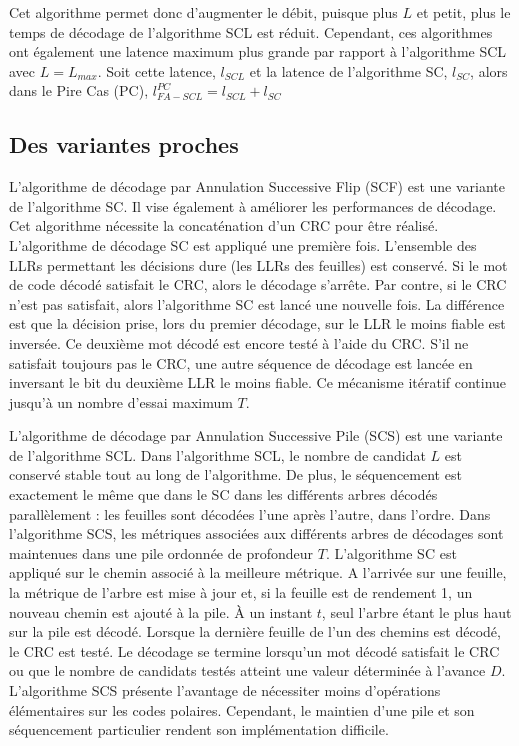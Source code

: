 Cet algorithme permet donc d'augmenter le débit, puisque plus $L$ et petit, plus le temps de décodage de l'algorithme SCL est réduit. Cependant, ces algorithmes ont également une latence maximum plus grande par rapport à l'algorithme SCL avec $L=L_{max}$. Soit cette latence, $l_{SCL}$ et la latence de l'algorithme SC, $l_{SC}$, alors dans le Pire Cas (PC), $l^{PC}_{FA-SCL}=l_{SCL}+l_{SC}$

\subsection{Des variantes proches}

	L'algorithme de décodage par Annulation Successive Flip (SCF) \cite{afisiadis_low-complexity_2014} est une variante de l'algorithme SC. Il vise également à améliorer les performances de décodage. Cet algorithme nécessite la concaténation d'un CRC pour être réalisé. L'algorithme de décodage SC est appliqué une première fois. L'ensemble des LLRs permettant les décisions dure (les LLRs des feuilles) est conservé. Si le mot de code décodé satisfait le CRC, alors le décodage s'arrête. Par contre, si le CRC n'est pas satisfait, alors l'algorithme SC est lancé une nouvelle fois. La différence est que la décision prise, lors du premier décodage, sur le LLR le moins fiable est inversée. Ce deuxième mot décodé est encore testé à l'aide du CRC. S'il ne satisfait toujours pas le CRC, une autre séquence de décodage est lancée en inversant le bit du deuxième LLR le moins fiable. Ce mécanisme itératif continue jusqu'à un nombre d'essai maximum $T$.


	L'algorithme de décodage par Annulation Successive Pile (SCS) \cite{chen_improved_2013} est une variante de l'algorithme SCL. Dans l'algorithme SCL, le nombre de candidat $L$ est conservé stable tout au long de l'algorithme. De plus, le séquencement est exactement le même que dans le SC dans les différents arbres décodés parallèlement : les feuilles sont décodées l'une après l'autre, dans l'ordre. Dans l'algorithme SCS, les métriques associées aux différents arbres de décodages sont maintenues dans une pile ordonnée de profondeur $T$. L'algorithme SC est appliqué sur le chemin associé à la meilleure métrique. A l'arrivée sur une feuille, la métrique de l'arbre est mise à jour et, si la feuille est de rendement 1, un nouveau chemin est ajouté à la pile. \`A un instant $t$, seul l'arbre étant le plus haut sur la pile est décodé. Lorsque la dernière feuille de l'un des chemins est décodé, le CRC est testé. Le décodage se termine lorsqu'un mot décodé satisfait le CRC ou que le nombre de candidats testés atteint une valeur déterminée à l'avance $D$. L'algorithme SCS présente l'avantage de nécessiter moins d'opérations élémentaires sur les codes polaires. Cependant, le maintien d'une pile et son séquencement particulier rendent son implémentation difficile.

